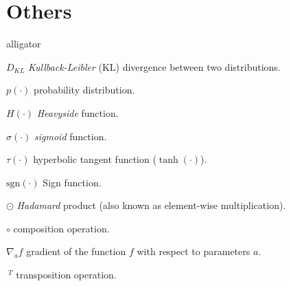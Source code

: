 \section*{Others}
\begin{labeling}{alligator}
	\item [$D_{KL}$]{\textit{Kullback-Leibler} (KL) divergence between two distributions.}
	\item [$p(\cdot)$]{probability distribution.}
	\item [$H(\cdot)$] \textit{Heavyside} function.
	\item [$\sigma(\cdot)$] \textit{sigmoid} function.
	\item [$\tau(\cdot)$] hyperbolic tangent function ($\tanh(\cdot)$).
	\item [$\mathrm{sgn}(\cdot)$] Sign function.
	\item [$\odot$] {\textit{Hadamard} product (also known as element-wise multiplication)}.
	\item [$\circ$] composition operation.
	\item [$\nabla_a f$] gradient of the function $f$ with respect to parameters $a$.
	\item [$\ ^T$] transposition operation.

\end{labeling}